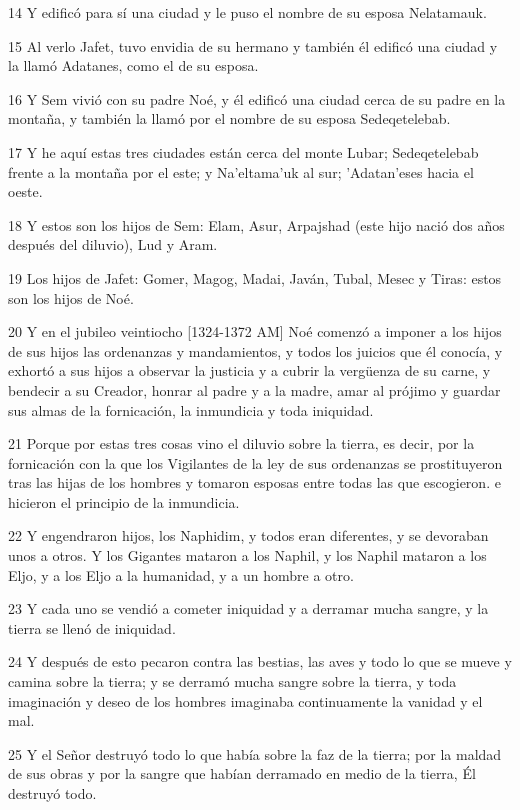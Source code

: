 \par 14 Y edificó para sí una ciudad y le puso el nombre de su esposa Nelatamauk.
\par 15 Al verlo Jafet, tuvo envidia de su hermano y también él edificó una ciudad y la llamó Adatanes, como el de su esposa.
\par 16 Y Sem vivió con su padre Noé, y él edificó una ciudad cerca de su padre en la montaña, y también la llamó por el nombre de su esposa Sedeqetelebab.
\par 17 Y he aquí estas tres ciudades están cerca del monte Lubar; Sedeqetelebab frente a la montaña por el este; y Na'eltama'uk al sur; 'Adatan'eses hacia el oeste.
\par 18 Y estos son los hijos de Sem: Elam, Asur, Arpajshad (este hijo nació dos años después del diluvio), Lud y Aram.
\par 19 Los hijos de Jafet: Gomer, Magog, Madai, Javán, Tubal, Mesec y Tiras: estos son los hijos de Noé.
\par 20 Y en el jubileo veintiocho [1324-1372 AM] Noé comenzó a imponer a los hijos de sus hijos las ordenanzas y mandamientos, y todos los juicios que él conocía, y exhortó a sus hijos a observar la justicia y a cubrir la vergüenza de su carne, y bendecir a su Creador, honrar al padre y a la madre, amar al prójimo y guardar sus almas de la fornicación, la inmundicia y toda iniquidad.
\par 21 Porque por estas tres cosas vino el diluvio sobre la tierra, es decir, por la fornicación con la que los Vigilantes de la ley de sus ordenanzas se prostituyeron tras las hijas de los hombres y tomaron esposas entre todas las que escogieron. e hicieron el principio de la inmundicia.
\par 22 Y engendraron hijos, los Naphidim, y todos eran diferentes, y se devoraban unos a otros. Y los Gigantes mataron a los Naphil, y los Naphil mataron a los Eljo, y a los Eljo a la humanidad, y a un hombre a otro.
\par 23 Y cada uno se vendió a cometer iniquidad y a derramar mucha sangre, y la tierra se llenó de iniquidad.
\par 24 Y después de esto pecaron contra las bestias, las aves y todo lo que se mueve y camina sobre la tierra; y se derramó mucha sangre sobre la tierra, y toda imaginación y deseo de los hombres imaginaba continuamente la vanidad y el mal.
\par 25 Y el Señor destruyó todo lo que había sobre la faz de la tierra; por la maldad de sus obras y por la sangre que habían derramado en medio de la tierra, Él destruyó todo.
